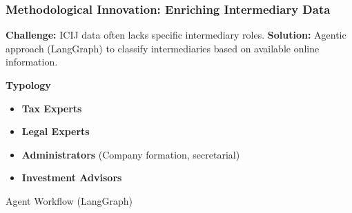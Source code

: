 \documentclass{beamer}
\begin{document}
\begin{frame}
    \frametitle{Methodological Innovation: Enriching Intermediary Data}

    \textbf{Challenge:} ICIJ data often lacks specific intermediary roles.
    \textbf{Solution:} Agentic approach (LangGraph) to classify intermediaries based on available online information.

    
    \textbf{Typology}
    \begin{itemize}
        \item \textbf{Tax Experts}
        \item \textbf{Legal Experts}
        \item \textbf{Administrators} (Company formation, secretarial)
        \item \textbf{Investment Advisors}
    \end{itemize}

     \begin{center}
        \scriptsize{Agent Workflow (LangGraph)}
    \end{center}
    

\end{frame}

\end{document}
